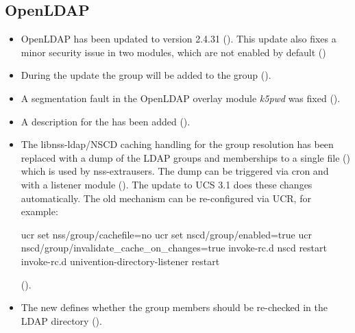\subsection{OpenLDAP}
\begin{itemize}
\item OpenLDAP has been updated to version 2.4.31
  (). This update also fixes a minor security issue in
  two modules, which are not enabled by default ()
\item During the update the group  will be
  added to the group  ().
\item A segmentation fault in the OpenLDAP overlay module \emph{k5pwd}
  was fixed ().
\item A description for the 
  has been added ().

\item The libnss-ldap/NSCD caching handling for the group resolution has
been replaced with a dump of the LDAP groups and memberships to a
single file () which is used by
nss-extrausers. The dump can be triggered via cron and with a listener
module (). The update to UCS 3.1 does these changes
automatically. The old mechanism can be re-configured via UCR, for
example:
\begin{ucsConfigFile}
  ucr set nss/group/cachefile=no
  ucr set nscd/group/enabled=true
  ucr nscd/group/invalidate_cache_on_changes=true
  invoke-rc.d nscd restart
  invoke-rc.d univention-directory-listener restart
\end{ucsConfigFile} ().

\item The new  defines
whether the group members should be re-checked in the LDAP directory
().

\end{itemize}



